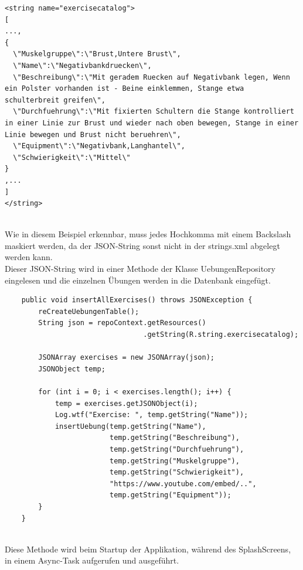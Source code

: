 \documentclass[FIPLY_base.tex]{subfiles}
\begin{document}
\begin{lstlisting}
<string name="exercisecatalog">
[
...,
{
  \"Muskelgruppe\":\"Brust,Untere Brust\",
  \"Name\":\"Negativbankdruecken\",
  \"Beschreibung\":\"Mit geradem Ruecken auf Negativbank legen, Wenn ein Polster vorhanden ist - Beine einklemmen, Stange etwa schulterbreit greifen\",
  \"Durchfuehrung\":\"Mit fixierten Schultern die Stange kontrolliert in einer Linie zur Brust und wieder nach oben bewegen, Stange in einer Linie bewegen und Brust nicht beruehren\",
  \"Equipment\":\"Negativbank,Langhantel\",
  \"Schwierigkeit\":\"Mittel\"
}
,...
]
</string>
\end{lstlisting}
\ \\
Wie in diesem Beispiel erkennbar, muss jedes Hochkomma mit einem Backslash maskiert werden, da der JSON-String sonst nicht in der strings.xml abgelegt werden kann.
\newpage
\ \\
Dieser JSON-String wird in einer Methode der Klasse UebungenRepository eingelesen und die einzelnen Übungen werden in die Datenbank eingefügt.
\ \\
\begin{lstlisting}
    public void insertAllExercises() throws JSONException {
        reCreateUebungenTable();
        String json = repoContext.getResources()
                                 .getString(R.string.exercisecatalog);

        JSONArray exercises = new JSONArray(json);
        JSONObject temp;

        for (int i = 0; i < exercises.length(); i++) {
            temp = exercises.getJSONObject(i);
            Log.wtf("Exercise: ", temp.getString("Name"));
            insertUebung(temp.getString("Name"), 
                         temp.getString("Beschreibung"),
                         temp.getString("Durchfuehrung"), 
                         temp.getString("Muskelgruppe"), 
                         temp.getString("Schwierigkeit"), 
                         "https://www.youtube.com/embed/..", 
                         temp.getString("Equipment"));
        }
    }
\end{lstlisting}
\ \\
Diese Methode wird beim Startup der Applikation, während des SplashScreens, in einem Async-Task aufgerufen und ausgeführt.



\newpage
\end{document}
